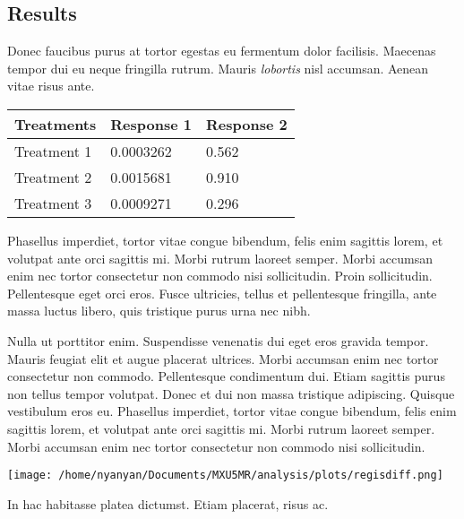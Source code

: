 \documentclass[a0,portrait]{a0poster}
\begin{document}
\begin{multicols}{2}
\section*{Results}

Donec faucibus purus at tortor egestas eu fermentum dolor facilisis. Maecenas tempor dui eu neque fringilla rutrum. Mauris \emph{lobortis} nisl accumsan. Aenean vitae risus ante.
%
\begin{wraptable}{l}{12cm} %
\begin{tabular}{l l l}
\toprule
\textbf{Treatments} & \textbf{Response 1} & \textbf{Response 2}\\
\midrule
Treatment 1 & 0.0003262 & 0.562 \\
Treatment 2 & 0.0015681 & 0.910 \\
Treatment 3 & 0.0009271 & 0.296 \\
\bottomrule
\end{tabular}
\end{wraptable}
%
Phasellus imperdiet, tortor vitae congue bibendum, felis enim sagittis lorem, et volutpat ante orci sagittis mi. Morbi rutrum laoreet semper. Morbi accumsan enim nec tortor consectetur non commodo nisi sollicitudin. Proin sollicitudin. Pellentesque eget orci eros. Fusce ultricies, tellus et pellentesque fringilla, ante massa luctus libero, quis tristique purus urna nec nibh.

Nulla ut porttitor enim. Suspendisse venenatis dui eget eros gravida tempor. Mauris feugiat elit et augue placerat ultrices. Morbi accumsan enim nec tortor consectetur non commodo. Pellentesque condimentum dui. Etiam sagittis purus non tellus tempor volutpat. Donec et dui non massa tristique adipiscing. Quisque vestibulum eros eu. Phasellus imperdiet, tortor vitae congue bibendum, felis enim sagittis lorem, et volutpat ante orci sagittis mi. Morbi rutrum laoreet semper. Morbi accumsan enim nec tortor consectetur non commodo nisi sollicitudin.

\begin{center}\vspace{1cm}
\texttt{[image: /home/nyanyan/Documents/MXU5MR/analysis/plots/regisdiff.png]}
\end{center}\vspace{1cm}

In hac habitasse platea dictumst. Etiam placerat, risus ac.


\end{multicols}
\end{document}
